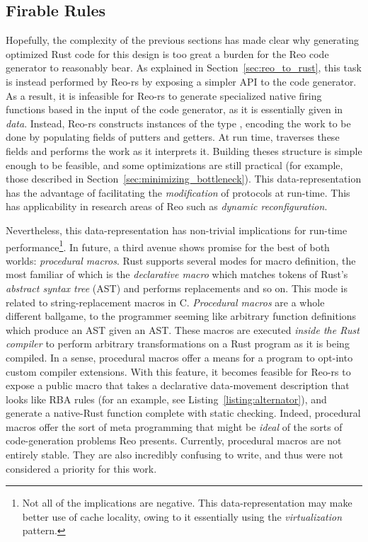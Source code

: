 \subsection{Firable Rules}
Hopefully, the complexity of the previous sections has made clear why generating optimized Rust code for this design is too great a burden for the Reo code generator to reasonably bear. As explained in Section~\ref{sec:reo_to_rust}, this task is instead performed by Reo-rs by exposing a simpler API to the code generator.
As a result, it is infeasible for Reo-rs to generate specialized native firing functions based in the input of the code generator, as it is essentially given in \textit{data}. Instead, Reo-rs constructs instances of the type , encoding the work to be done by populating fields of putters and getters. At run time,  traverses these fields and performs the work as it interprets it. Building theses structure is simple enough to be feasible, and some optimizations are still practical (for example, those described in Section~\ref{sec:minimizing_bottleneck}). This data-representation has the advantage of facilitating the \textit{modification} of protocols at run-time. This has applicability in research areas of Reo such as \textit{dynamic reconfiguration}.

Nevertheless, this data-representation has non-trivial implications for run-time performance\footnote{Not all of the implications are negative. This data-representation may make better use of cache locality, owing to it essentially using the \textit{virtualization} pattern.}. In future, a third avenue shows promise for the best of both worlds: \textit{procedural macros}. Rust supports several modes for macro definition, the most familiar of which is the \textit{declarative macro} which matches tokens of Rust's \textit{abstract syntax tree} (AST) and performs replacements and so on. This mode is related to string-replacement macros in C. \textit{Procedural macros} are a whole different ballgame, to the programmer seeming like arbitrary function definitions which produce an AST given an AST. These macros are executed \textit{inside the Rust compiler} to perform arbitrary transformations on a Rust program as it is being compiled. In a sense, procedural macros offer a means for a program to opt-into custom compiler extensions. With this feature, it becomes feasible for Reo-rs to expose a public macro that takes a declarative data-movement description that looks like RBA rules (for an example, see Listing~\ref{listing:alternator}), and generate a native-Rust function complete with static checking. Indeed, procedural macros offer the sort of meta programming that might be \textit{ideal} of the sorts of code-generation problems Reo presents. Currently, procedural macros are not entirely stable. They are also incredibly confusing to write, and thus were not considered a priority for this work.

